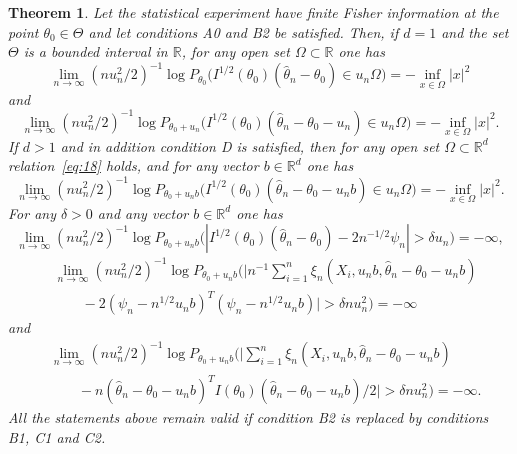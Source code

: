 \documentclass[11pt,a4paper]{article}
\newtheorem{theorem}{Theorem}[section]
\begin{document}
\begin{theorem}\label{th:MLE}
Let the statistical experiment have finite Fisher information at the point $\theta_0\in\Theta$ and let conditions A0 and B2 be satisfied. Then, if $d=1$ and the set $\Theta$ is a bounded interval in $\mathbb{R}$, for any open set $\Omega\subset\mathbb{R}$ one has
\begin{equation}
\lim_{n\to\infty}(nu_n^2/2)^{-1}\log P_{\theta_0}\bigl(I^{1/2}(\theta_0)(\hat\theta_n-\theta_0)\in u_n\Omega\bigr)=-\inf_{x\in\Omega}|x|^2
\label{eq:18}
\end{equation}
and
\begin{equation}
\lim_{n\to\infty}(nu_n^2/2)^{-1}\log P_{\theta_0+u_n}\bigl(I^{1/2}(\theta_0)(\hat\theta_n-\theta_0-u_n)\in u_n\Omega\bigr)=-\inf_{x\in\Omega}|x|^2.
\label{eq:19}
\end{equation}
If $d>1$ and in addition condition D is satisfied, then for any open set $\Omega\subset\mathbb{R}^d$ relation~\eqref{eq:18} holds, and for any vector $b\in\mathbb{R}^d$ one has
\begin{equation}
\lim_{n\to\infty}(nu_n^2/2)^{-1}\log P_{\theta_0+u_nb}\bigl(I^{1/2}(\theta_0)(\hat\theta_n-\theta_0-u_nb)\in u_n\Omega\bigr)=-\inf_{x\in\Omega}|x|^2.
\label{eq:20}
\end{equation}
For any $\delta>0$ and any vector $b\in\mathbb{R}^d$ one has
\begin{equation}
\lim_{n\to\infty}(nu_n^2/2)^{-1}\log P_{\theta_0+u_nb}\bigl(|I^{1/2}(\theta_0)(\hat\theta_n-\theta_0)-2n^{-1/2}\psi_n|>\delta u_n\bigr)=-\infty,
\label{eq:21}
\end{equation}
\begin{equation}
\begin{aligned}
&\lim_{n\to\infty}(nu_n^2/2)^{-1}\log P_{\theta_0+u_nb}\Biggl(
\Biggl|n^{-1}\sum_{i=1}^n\xi_n(X_i,u_nb,\hat\theta_n-\theta_0-u_nb)\\
&\qquad-2(\psi_n-n^{1/2}u_nb)^T(\psi_n-n^{1/2}u_nb)\Biggr|>\delta nu_n^2\Biggr)=-\infty
\end{aligned}
\label{eq:22}
\end{equation}
and
\begin{equation}
\begin{aligned}
&\lim_{n\to\infty}(nu_n^2/2)^{-1}\log P_{\theta_0+u_nb}\Biggl(
\Biggl|\sum_{i=1}^n\xi_n(X_i,u_nb,\hat\theta_n-\theta_0-u_nb)\\
&\qquad-n(\hat\theta_n-\theta_0-u_nb)^T I(\theta_0)(\hat\theta_n-\theta_0-u_nb)/2\Biggr|>\delta nu_n^2\Biggr)=-\infty.
\end{aligned}
\label{eq:23}
\end{equation}
All the statements above remain valid if condition B2 is replaced by conditions B1, C1 and C2.
\end{theorem}
\end{document}
